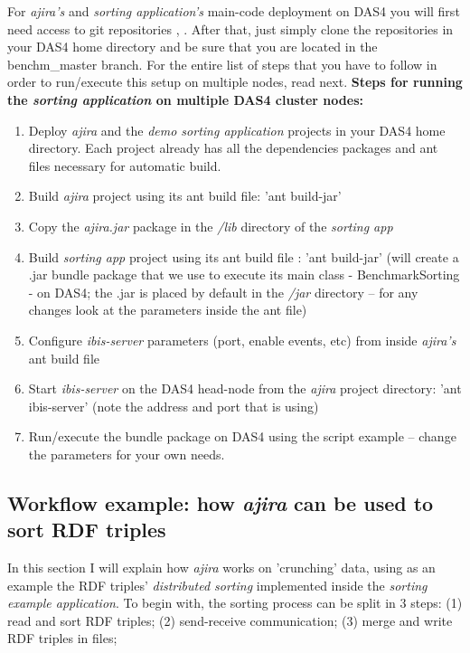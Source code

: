 For \textit{ajira's} and \textit{sorting application's} main-code deployment on DAS4 you will first need access to git repositories \cite{arch_repo}, \cite{qpie_repo}. After that, just simply clone the repositories in your DAS4 home directory and be sure that you are located in the benchm\_master branch. For the entire list of steps that you have to follow in order to run/execute this setup on multiple nodes, read next.
\newline
\newline
\textbf{Steps for running the \textit{sorting application} on multiple DAS4 cluster nodes:}
\begin{enumerate}
	\item Deploy \textit{ajira} and the \textit{demo sorting application} projects in your DAS4 home directory. Each project already has all the dependencies packages and ant files necessary for automatic build. 
	\item Build \textit{ajira} project using its ant build file: 'ant build-jar' 
	\item Copy the \textit{ajira.jar} package in the \textit{/lib} directory of the \textit{sorting app}
	\item Build \textit{sorting app} project using its ant build file \cite{build_file}: 'ant build-jar' (will create a .jar bundle package that we use to execute its main class - BenchmarkSorting - on DAS4; the .jar is placed by default in the \textit{/jar} directory -- for any changes look at the parameters inside the ant file)
	\item Configure \textit{ibis-server} parameters (port, enable events, etc) from inside \textit{ajira's} ant build file 
	\item Start \textit{ibis-server} on the DAS4 head-node from the \textit{ajira} project directory: 'ant ibis-server' (note the address and port that is using)
	\item Run/execute the bundle package on DAS4 using the script example \cite{run_on_das4} -- change the parameters for your own needs.
\end{enumerate}

% 
\subsection{Workflow example: how \textit{ajira} can be used to sort RDF triples}

In this section I will explain how \textit{ajira} works on 'crunching' data, using as an example the RDF triples' \textit{distributed sorting} implemented inside the \textit{sorting example application}. To begin with, the sorting process can be split in 3 steps: (1) read and sort RDF triples; (2) send-receive communication; (3) merge and write RDF triples in files;

